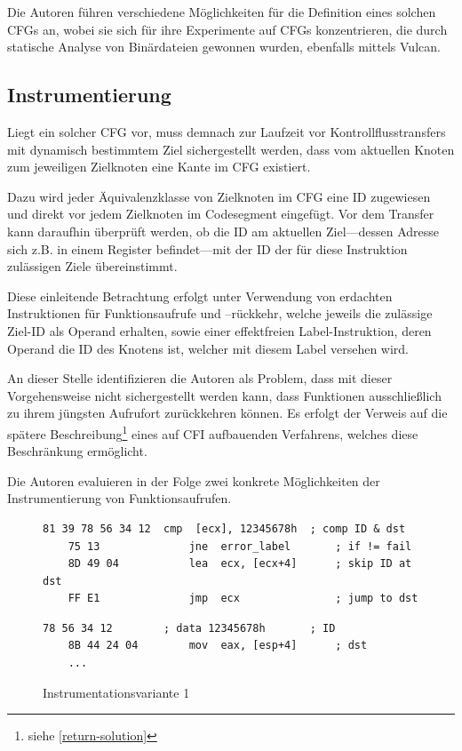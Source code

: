 \documentclass[11pt]{article}
\begin{document}
Die Autoren führen verschiedene Möglichkeiten für die Definition eines solchen
CFGs an, wobei sie sich für ihre Experimente auf CFGs konzentrieren, die durch
statische Analyse von Binärdateien gewonnen wurden, ebenfalls mittels Vulcan.


\subsection{Instrumentierung}

Liegt ein solcher CFG vor, muss demnach zur Laufzeit vor Kontrollflusstransfers
mit dynamisch bestimmtem Ziel sichergestellt werden, dass vom aktuellen Knoten
zum jeweiligen Zielknoten eine Kante im CFG existiert.

Dazu wird jeder Äquivalenzklasse von Zielknoten im CFG eine ID zugewiesen und
direkt vor jedem Zielknoten im Codesegment eingefügt. Vor dem Transfer kann
daraufhin überprüft werden, ob die ID am aktuellen Ziel—dessen Adresse sich
z.B. in einem Register befindet—mit der ID der für diese Instruktion zulässigen
Ziele übereinstimmt.

Diese einleitende Betrachtung erfolgt unter Verwendung von erdachten
Instruktionen für Funktionsaufrufe und –rückkehr, welche jeweils die zulässige
Ziel-ID als Operand erhalten, sowie einer effektfreien Label-Instruktion, deren
Operand die ID des Knotens ist, welcher mit diesem Label versehen wird.

\label{return-problem}

An dieser Stelle identifizieren die Autoren als Problem, dass mit dieser
Vorgehensweise nicht sichergestellt werden kann, dass Funktionen ausschließlich
zu ihrem jüngsten Aufrufort zurückkehren können. Es erfolgt der Verweis auf die
spätere Beschreibung\footnote{siehe \ref{return-solution}} eines auf CFI
aufbauenden Verfahrens, welches diese Beschränkung ermöglicht.

Die Autoren evaluieren in der Folge zwei konkrete Möglichkeiten der
Instrumentierung von Funktionsaufrufen.

\lstset{
  language=[x86masm]Assembler,
  basicstyle=\ttfamily\small,
  frame=lines
}

\begin{figure}
  \begin{lstlisting}[title=Quelle]
    81 39 78 56 34 12  cmp  [ecx], 12345678h  ; comp ID & dst
    75 13              jne  error_label       ; if != fail
    8D 49 04           lea  ecx, [ecx+4]      ; skip ID at dst
    FF E1              jmp  ecx               ; jump to dst
  \end{lstlisting}

  \begin{lstlisting}[title=Ziel]
    78 56 34 12        ; data 12345678h       ; ID
    8B 44 24 04        mov  eax, [esp+4]      ; dst
    ...
  \end{lstlisting}

  \caption{Instrumentationsvariante 1}
  \label{fig:instrumentation-variant1}
\end{figure}
\end{document}
